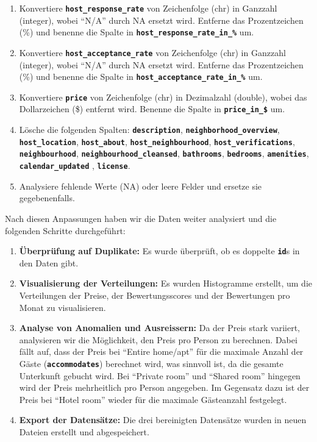 \documentclass[
  journal,
]{IEEEtran}%
\begin{document}
\begin{enumerate}
\def\labelenumi{\arabic{enumi}.}
\item
  Konvertiere \textbf{\texttt{host\_response\_rate}} von Zeichenfolge
  (chr) in Ganzzahl (integer), wobei ``N/A'' durch NA ersetzt wird.
  Entferne das Prozentzeichen (\%) und benenne die Spalte in
  \textbf{\texttt{host\_response\_rate\_in\_\%}} um.
\item
  Konvertiere \textbf{\texttt{host\_acceptance\_rate}} von Zeichenfolge
  (chr) in Ganzzahl (integer), wobei ``N/A'' durch NA ersetzt wird.
  Entferne das Prozentzeichen (\%) und benenne die Spalte in
  \textbf{\texttt{host\_acceptance\_rate\_in\_\%}} um.
\item
  Konvertiere \textbf{\texttt{price}} von Zeichenfolge (chr) in
  Dezimalzahl (double), wobei das Dollarzeichen (\$) entfernt wird.
  Benenne die Spalte in \textbf{\texttt{price\_in\_\$}} um.
\item
  Lösche die folgenden Spalten: \textbf{\texttt{description}},
  \textbf{\texttt{neighborhood\_overview}},
  \textbf{\texttt{host\_location}}, \textbf{\texttt{host\_about}},
  \textbf{\texttt{host\_neighbourhood}},
  \textbf{\texttt{host\_verifications}},
  \textbf{\texttt{neighbourhood}},
  \textbf{\texttt{neighbourhood\_cleansed}},
  \textbf{\texttt{bathrooms}}, \textbf{\texttt{bedrooms}},
  \textbf{\texttt{amenities}}, \textbf{\texttt{calendar\_updated}} ,
  \textbf{\texttt{license}}.
\item
  Analysiere fehlende Werte (NA) oder leere Felder und ersetze sie
  gegebenenfalls.
\end{enumerate}

Nach diesen Anpassungen haben wir die Daten weiter analysiert und die
folgenden Schritte durchgeführt:

\begin{enumerate}
\def\labelenumi{\arabic{enumi}.}
\item
  \textbf{Überprüfung auf Duplikate:} Es wurde überprüft, ob es doppelte
  \textbf{\texttt{id}}s in den Daten gibt.
\item
  \textbf{Visualisierung der Verteilungen:} Es wurden Histogramme
  erstellt, um die Verteilungen der Preise, der Bewertungsscores und der
  Bewertungen pro Monat zu visualisieren.
\item
  \textbf{Analyse von Anomalien und Ausreissern:} Da der Preis stark
  variiert, analysieren wir die Möglichkeit, den Preis pro Person zu
  berechnen. Dabei fällt auf, dass der Preis bei ``Entire home/apt'' für
  die maximale Anzahl der Gäste (\textbf{\texttt{accommodates}})
  berechnet wird, was sinnvoll ist, da die gesamte Unterkunft gebucht
  wird. Bei ``Private room'' und ``Shared room'' hingegen wird der Preis
  mehrheitlich pro Person angegeben. Im Gegensatz dazu ist der Preis bei
  ``Hotel room'' wieder für die maximale Gästeanzahl festgelegt.
\item
  \textbf{Export der Datensätze:} Die drei bereinigten Datensätze wurden
  in neuen Dateien erstellt und abgespeichert.
\end{enumerate}
\end{document}
